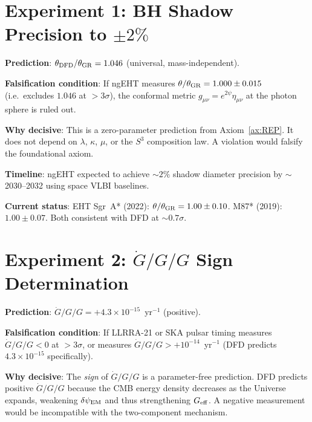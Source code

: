 \documentclass[11pt]{article}
\newcommand{\ee}[1]{\times 10^{#1}}
\newcommand{\dpsiEM}{\delta\psi_{\rm EM}}
\newcommand{\Geff}{G_{\rm eff}}
\newcommand{\Gdot}{\dot{G}/G}
\newcommand{\mufd}{\mu}
\begin{document}
\section{Experiment 1: BH Shadow Precision to $\pm 2\%$}
\label{sec:falsify-shadow}

\textbf{Prediction}: $\theta_{\rm DFD}/\theta_{\rm GR} = 1.046$
(universal, mass-independent).

\textbf{Falsification condition}: If ngEHT measures
$\theta/\theta_{\rm GR} = 1.000 \pm 0.015$ (i.e.\ excludes $1.046$ at
$>3\sigma$), the conformal metric $g_{\mu\nu} = e^{2\psi}\eta_{\mu\nu}$
at the photon sphere is ruled out.

\textbf{Why decisive}: This is a zero-parameter prediction from
Axiom~\ref{ax:REP}. It does not depend on $\lambda$, $\kappa$, $\mufd$,
or the $S^3$ composition law. A violation would falsify the foundational
axiom.

\textbf{Timeline}: ngEHT expected to achieve $\sim 2\%$ shadow
diameter precision by $\sim$2030--2032 using space VLBI baselines.

\textbf{Current status}: EHT Sgr~A* (2022): $\theta/\theta_{\rm GR}
= 1.00 \pm 0.10$. M87* (2019): $1.00 \pm 0.07$. Both consistent
with DFD at $\sim 0.7\sigma$.


\section{Experiment 2: $\Gdot/G$ Sign Determination}
\label{sec:falsify-Gdot}

\textbf{Prediction}: $\Gdot/G = +4.3\ee{-15}$~yr$^{-1}$ (positive).

\textbf{Falsification condition}: If LLRRA-21 or SKA pulsar timing
measures $\Gdot/G < 0$ at $>3\sigma$, or measures
$\Gdot/G > +10^{-14}$~yr$^{-1}$ (DFD predicts $4.3\ee{-15}$
specifically).

\textbf{Why decisive}: The \emph{sign} of $\Gdot/G$ is a
parameter-free prediction. DFD predicts positive $\Gdot/G$ because
the CMB energy density decreases as the Universe expands, weakening
$\dpsiEM$ and thus strengthening $\Geff$. A negative measurement
would be incompatible with the two-component mechanism.
\end{document}
